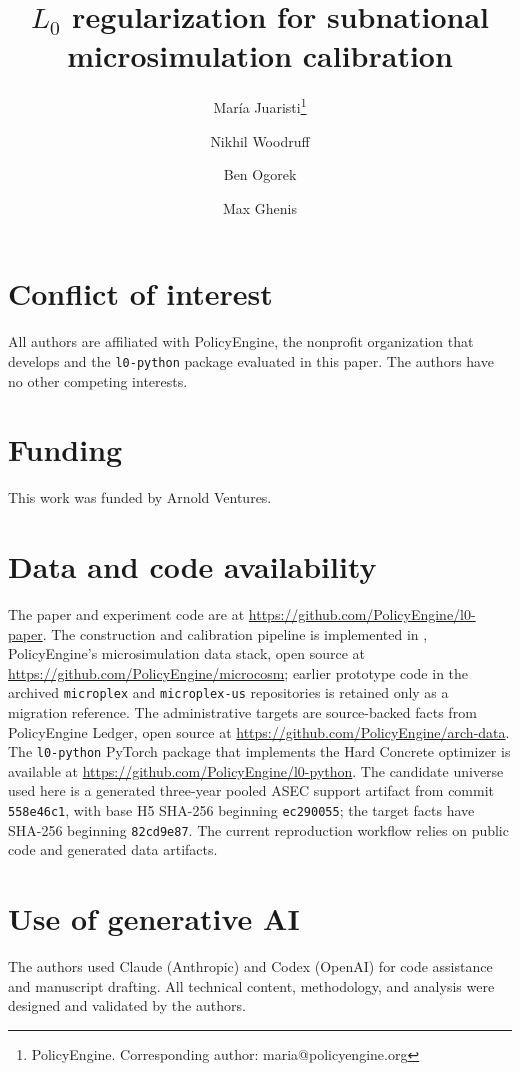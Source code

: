 \documentclass[11pt]{article}
\title{$L_0$ regularization for subnational microsimulation calibration}
\author{
    María Juaristi\thanks{PolicyEngine. Corresponding author: maria@policyengine.org} \and
    Nikhil Woodruff\footnotemark[1] \and
    Ben Ogorek\footnotemark[1] \and
    Max Ghenis\footnotemark[1]
}
\date{}
\begin{document}
\maketitle











\section*{Conflict of interest}
All authors are affiliated with PolicyEngine, the nonprofit organization that develops \microcosm{} and
the \texttt{l0-python} package evaluated in this paper. The authors have no other competing interests.

\section*{Funding}
This work was funded by Arnold Ventures.

\section*{Data and code availability}
The paper and experiment code are at \url{https://github.com/PolicyEngine/l0-paper}. The construction
and calibration pipeline is implemented in \microcosm{}, PolicyEngine's microsimulation data stack,
open source at \url{https://github.com/PolicyEngine/microcosm}; earlier prototype code in the archived
\texttt{microplex} and \texttt{microplex-us} repositories is retained only as a migration reference.
The administrative targets are source-backed facts from PolicyEngine Ledger, open source at
\url{https://github.com/PolicyEngine/arch-data}.
The \texttt{l0-python} PyTorch package that implements the Hard Concrete optimizer is available at
\url{https://github.com/PolicyEngine/l0-python}. The candidate universe used here is a generated
three-year pooled ASEC support artifact from \microcosm{} commit \texttt{558e46c1}, with base H5 SHA-256
beginning \texttt{ec290055}; the target facts have SHA-256 beginning \texttt{82cd9e87}. The current
reproduction workflow relies on public code and generated data artifacts.

\section*{Use of generative AI}
The authors used Claude (Anthropic) and Codex (OpenAI) for code assistance and manuscript drafting. All technical
content, methodology, and analysis were designed and validated by the authors.





\end{document}
